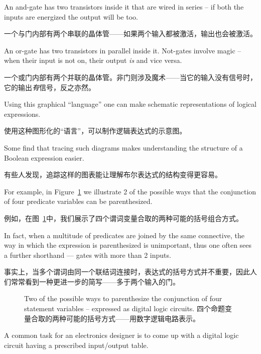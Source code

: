 \begin{center}

\end{center}

An and-gate has two transistors inside it that are wired in series -- 
if both the inputs are energized the output will be too.

一个与门内部有两个串联的晶体管——如果两个输入都被激活，输出也会被激活。

An
or-gate has two transistors in parallel inside it.  Not-gates 
involve magic -- when their input is not on, their output \emph{is}
and vice versa.

一个或门内部有两个并联的晶体管。非门则涉及魔术——当它的输入没有信号时，它的输出\emph{有}信号，反之亦然。

Using this graphical ``language'' one can make schematic 
representations of logical expressions.

使用这种图形化的“语言”，可以制作逻辑表达式的示意图。

Some find that 
tracing such diagrams makes understanding the structure 
of a Boolean expression easier.

有些人发现，追踪这样的图表能让理解布尔表达式的结构变得更容易。

For example, in Figure~\ref{fig:3ands}
we illustrate 2 of the possible ways that the conjunction
of four predicate variables can be parenthesized.

例如，在图~\ref{fig:3ands}中，我们展示了四个谓词变量合取的两种可能的括号组合方式。

In fact, when
a multitude of predicates are joined by the same connective,
the way in which the expression is parenthesized is unimportant,
thus one often sees a further shorthand --- gates with more than
2 inputs.

事实上，当多个谓词由同一个联结词连接时，表达式的括号方式并不重要，因此人们常常看到一种更进一步的简写——多于两个输入的门。

\begin{figure}[!hbtp] 
\centerline{}
\caption[Parenthesizations expressed as digital logic circuits.]{%
Two of the possible ways to parenthesize the conjunction %
of four statement variables -- expressed as digital logic circuits. 四个命题变量合取的两种可能的括号方式——用数字逻辑电路表示。}
\label{fig:3ands}
\end{figure}

A common task for an electronics designer is to come up with
a digital logic circuit having a prescribed input/output table.


